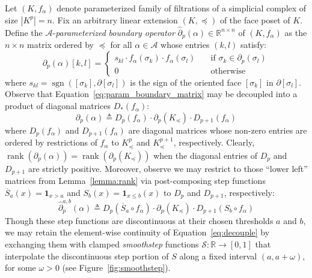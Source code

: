 \documentclass[pdflatex,sn-mathphys-num]{sn-jnl}
\begin{document}
Let \(\left( K,f_{\alpha} \right)\) denote parameterized family of filtrations of a simplicial complex of size \(\left| K^{p} \right| = n\). Fix an arbitrary linear extension \( (K, \preceq ) \) of the face poset of \(K\). Define the \(\mathcal{A}\)-\emph{parameterized} \emph{boundary operator} \({\hat{\partial}}_{p}(\alpha) \in \mathbb{R}^{n \times n}\) of \(\left( K,f_{\alpha} \right)\) as the \(n \times n\) matrix ordered by \(\preceq\) for all \(\alpha \in \mathcal{A}\) whose entries \((k,l)\) satisfy:
\[\partial_{p}(\alpha) [ k,l]  = \begin{cases} \label{eq:param_boundary_matrix}
s_{kl} \cdot f_{\alpha}\left( \sigma_{k} \right) \cdot f_{\alpha}\left( \sigma_{l} \right) & \quad\text{if }\sigma_{k} \in \partial_{p}\left( \sigma_{l} \right) \\
0 & \quad\text{otherwise}
\end{cases} \]
\noindent where \(s_{kl} = \operatorname{sgn} \left(  \left[ \sigma_{k} \right] ,\partial \left[ \sigma_{l} \right]  \right) \) is the sign of the oriented face \( \left[ \sigma_{k} \right] \) in \(\partial \left[ \sigma_{l} \right] \). Observe that Equation~\ref{eq:param_boundary_matrix} may be decoupled into a product of diagonal matrices \(D_{\ast}\left( f_{\alpha} \right)\):
\begin{equation}\label{eq:decouple}
	\partial_{p}(\alpha) \triangleq D_{p}\left( f_{\alpha} \right) \cdot \partial_{p} \left( K_{\preceq} \right)  \cdot D_{p + 1}\left( f_{\alpha} \right)
\end{equation}
where \(D_{p}\left( f_{\alpha} \right)\) and \(D_{p + 1}\left( f_{\alpha} \right)\) are diagonal matrices whose non-zero entries are ordered by restrictions of \(f_{\alpha}\) to \(K_{\preceq}^{p}\) and \(K_{\preceq}^{p + 1}\), respectively. Clearly, \(\operatorname{rank}\left( \partial_{p}(\alpha) \right) = \operatorname{rank} \left( \partial_{p} \left( K_{\preceq} \right)  \right) \) when the diagonal entries of \(D_{p}\) and \(D_{p + 1}\) are strictly positive. Moreover, observe we may restrict to those ``lower left'' matrices from Lemma~\ref{lemma:rank} via post-composing step functions $\overline{S}_{a}(x) = \mathbf{1}_{x > a}$ and \(S_{b}(x) = \mathbf{1}_{x \leq b}(x)\) to \(D_{p}\) and \(D_{p + 1}\), respectively:
\[ \label{eq:rank_equiv_param}
{\hat{\partial}}_{p}^{a,b}(\alpha) \triangleq D_{p}\left( {\overline{S}}_{a} \circ f_{\alpha} \right) \cdot \partial_{p} \left( K_{\preceq} \right)  \cdot D_{p + 1}\left( S_{b} \circ f_{\alpha} \right)
\]
\noindent Though these step functions are discontinuous at their chosen thresholds \(a\) and \(b\), we may retain the element-wise continuity of Equation~\ref{eq:decouple} by exchanging them with clamped \emph{smoothstep} functions \(\mathcal{S}:\mathbb{R} \rightarrow  [ 0,1] \) that interpolate the discontinuous step portion of \(S\) along a fixed interval \((a,a + \omega)\), for some \(\omega > 0\) (see Figure~\ref{fig:smoothstep}).
\end{document}

